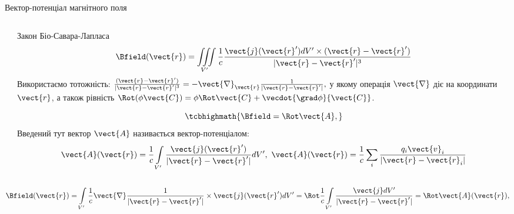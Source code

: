 \documentclass{beamer}
\begin{document}
\begin{frame}[t]{Вектор-потенціал магнітного поля}{}
\begin{columns}
\begin{column}{0.3\linewidth}
		\end{column}
		\begin{column}{0.7\linewidth}
			\begin{overprint}
				\begin{block}{}
					Закон Біо-Савара-Лапласа
					\begin{equation*}
						\Bfield(\vect{r}) = \iiint\limits_{V'} \frac1c \frac{ \vect{j}(\vect{r}')dV'\times(\vect{r} - \vect{r}') }{|\vect{r} -
							\vect{r}'|^3}
					\end{equation*}
					{\scriptsize
					Використаємо тотожність:
					\(
					\frac{ (\vect{r} - \vect{r}') }{|\vect{r} - \vect{r}'|^3} = - \vect{\nabla}_{\vect{r}} \frac{ 1 }{|\vect{r} - \vect{r}'|},
					\)
					у якому операція $\vect{\nabla}$ діє на координати $\vect{r}$, а також рівність
					$\Rot(\phi\vect{C}) = \phi\Rot\vect{C} + \vecdot{\grad\phi}{\vect{C}} $.}
				\end{block}
				\onslide<2>
				\begin{block}{}
					\begin{equation*}
						\tcbhighmath{\Bfield = \Rot\vect{A},}
					\end{equation*}
					Введений тут вектор $\vect{A}$ називається \alert{вектор-потенціалом}:
					\begin{equation*}
						\vect{A}(\vect{r}) = \frac1c \int\limits_{V'} \frac{\vect{j}(\vect{r}')}{|\vect{r} - \vect{r}'|} dV',
						\
						\vect{A}(\vect{r}) = \frac1c \sum\limits_i \frac{q_i\vect{v}_i}{|\vect{r} - \vect{r}_i|}
					\end{equation*}
				\end{block}
			\end{overprint}
		\end{column}
	\end{columns}
	\begin{overprint}
		\begin{block}{}
			\begin{equation*}
				\Bfield(\vect{r}) =\int\limits_{V'} \frac1c \vect{\nabla} \frac{ 1 }{|\vect{r} - \vect{r}'|}\times\vect{j} (\vect{r}') dV'  =
				\Rot \frac1c \int\limits_{V'} \frac{\vect{j}dV'}{|\vect{r} - \vect{r}'|}  = \Rot\vect{A}(\vect{r}),

\end{equation*}
\end{block}
\end{overprint}
\end{frame}
\end{document}

